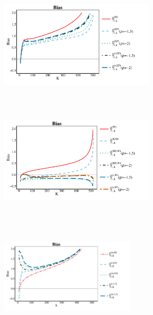 \begin{landscape}

\begin{figure}[h]
	\centering
	\begin{subfigure}[h]{0.3\linewidth}
		\includegraphics[width=7.5cm,height=5.5cm]{./plots/paper2/Bias_simulations_B12_H.pdf}
	\end{subfigure}
	\hspace{\fill}
	\begin{subfigure}[h]{0.3\linewidth}
		\includegraphics[width=7.5cm,height=5.5cm]{./plots/paper2/Bias_simulations_B12_W.pdf}
	\end{subfigure}
	\hspace{\fill}
	\begin{subfigure}[h]{0.3\linewidth}
		\includegraphics[width=6.5cm,height=5.5cm]{./plots/paper2/Bias_simulations_B12_B.pdf}
	\end{subfigure}
	\hspace{\fill}

\end{figure}
\end{landscape}
